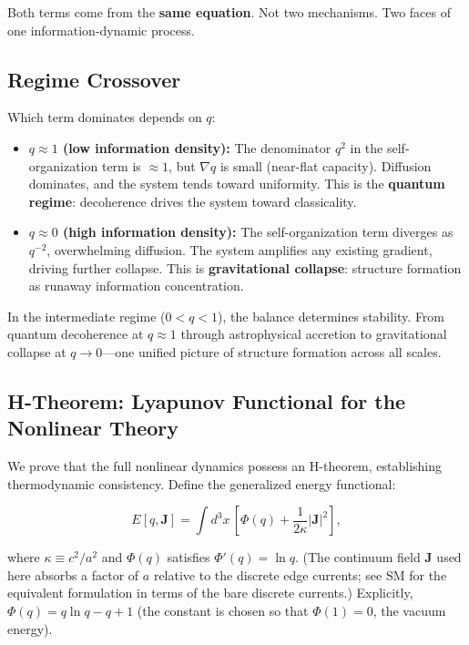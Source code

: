 \documentclass[aps,prd,twocolumn,showpacs,superscriptaddress,preprintnumbers]{revtex4-2}
\begin{document}
Both terms come from the \textbf{same equation}.
Not two mechanisms. Two faces of one information-dynamic process.

\subsection{Regime Crossover}

Which term dominates depends on $q$:

\begin{itemize}
    \item \textbf{$q\approx1$ (low information density):} The denominator $q^2$ in the self-organization term is $\approx1$, but $\nabla q$ is small (near-flat capacity). Diffusion dominates, and the system tends toward uniformity. This is the \textbf{quantum regime}: decoherence drives the system toward classicality.

    \item \textbf{$q\approx0$ (high information density):} The self-organization term diverges as $q^{-2}$, overwhelming diffusion. The system amplifies any existing gradient, driving further collapse. This is \textbf{gravitational collapse}: structure formation as runaway information concentration.
\end{itemize}

In the intermediate regime ($0<q<1$), the balance determines stability.
From quantum decoherence at $q\approx1$ through astrophysical accretion to gravitational collapse at $q\to0$---one unified picture of structure formation across all scales.

\subsection{H-Theorem: Lyapunov Functional for the Nonlinear Theory}

\label{sec:lyapunov}

We prove that the full nonlinear dynamics possess an H-theorem, establishing thermodynamic consistency.
Define the generalized energy functional:

\begin{equation}
E[q,\mathbf{J}] = \int d^3x\,\left[\Phi(q) + \frac{1}{2\kappa}|\mathbf{J}|^2\right],
\label{eq:lyapunov_E}
\end{equation}

where $\kappa\equiv c^2/a^2$ and $\Phi(q)$ satisfies $\Phi'(q)=\ln q$. (The continuum field $\mathbf{J}$ used here absorbs a factor of $a$ relative to the discrete edge currents; see SM for the equivalent formulation in terms of the bare discrete currents.)
Explicitly, $\Phi(q)=q\ln q - q + 1$ (the constant is chosen so that $\Phi(1)=0$, the vacuum energy).
\end{document}
